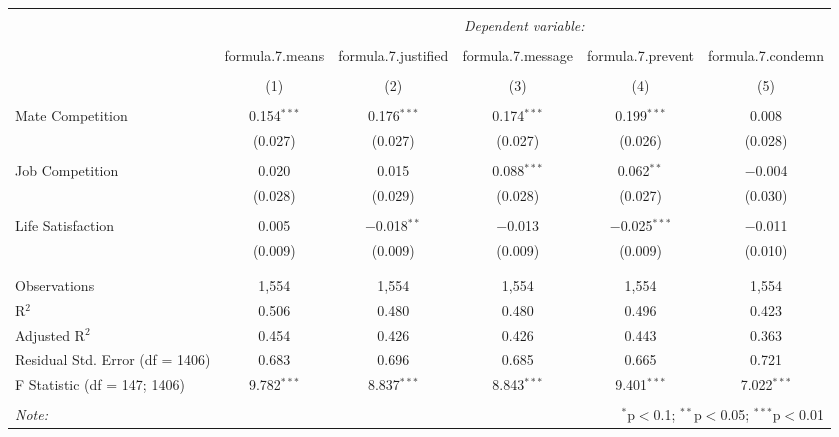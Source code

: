 
\begin{table}[!htbp] \centering 
  \caption{} 
  \label{} 
\begin{tabular}{@{\extracolsep{5pt}}lccccc} 
\\[-1.8ex]\hline 
\hline \\[-1.8ex] 
 & \multicolumn{5}{c}{\textit{Dependent variable:}} \\ 
\cline{2-6} 
\\[-1.8ex] & formula.7.means & formula.7.justified & formula.7.message & formula.7.prevent & formula.7.condemn \\ 
\\[-1.8ex] & (1) & (2) & (3) & (4) & (5)\\ 
\hline \\[-1.8ex] 
 Mate Competition & 0.154$^{***}$ & 0.176$^{***}$ & 0.174$^{***}$ & 0.199$^{***}$ & 0.008 \\ 
  & (0.027) & (0.027) & (0.027) & (0.026) & (0.028) \\ 
  & & & & & \\ 
 Job Competition & 0.020 & 0.015 & 0.088$^{***}$ & 0.062$^{**}$ & $-$0.004 \\ 
  & (0.028) & (0.029) & (0.028) & (0.027) & (0.030) \\ 
  & & & & & \\ 
 Life Satisfaction & 0.005 & $-$0.018$^{**}$ & $-$0.013 & $-$0.025$^{***}$ & $-$0.011 \\ 
  & (0.009) & (0.009) & (0.009) & (0.009) & (0.010) \\ 
  & & & & & \\ 
\hline \\[-1.8ex] 
Observations & 1,554 & 1,554 & 1,554 & 1,554 & 1,554 \\ 
R$^{2}$ & 0.506 & 0.480 & 0.480 & 0.496 & 0.423 \\ 
Adjusted R$^{2}$ & 0.454 & 0.426 & 0.426 & 0.443 & 0.363 \\ 
Residual Std. Error (df = 1406) & 0.683 & 0.696 & 0.685 & 0.665 & 0.721 \\ 
F Statistic (df = 147; 1406) & 9.782$^{***}$ & 8.837$^{***}$ & 8.843$^{***}$ & 9.401$^{***}$ & 7.022$^{***}$ \\ 
\hline 
\hline \\[-1.8ex] 
\textit{Note:}  & \multicolumn{5}{r}{$^{*}$p$<$0.1; $^{**}$p$<$0.05; $^{***}$p$<$0.01} \\ 
\end{tabular} 
\end{table} 
